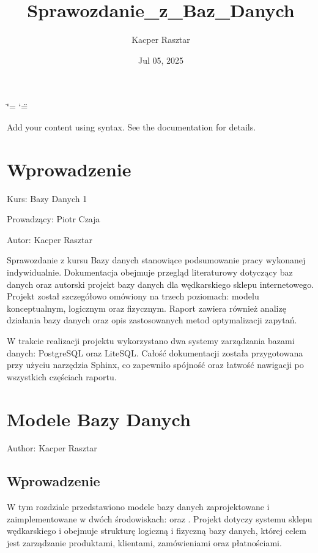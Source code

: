 \documentclass[letterpaper,10pt,english]{sphinxmanual}
\title{Sprawozdanie\_z\_Baz\_Danych}
\date{Jul 05, 2025}
\author{Kacper Rasztar}
\begin{document}
\ifdefined\shorthandoff
  \ifnum\catcode`\=\string=\active\shorthandoff{=}\fi
  \ifnum\catcode`\"=\active{}\fi
\fi

\pagestyle{empty}
\sphinxmaketitle
\pagestyle{plain}
\sphinxtableofcontents
\pagestyle{normal}
\label{\detokenize{index::doc}}


\sphinxAtStartPar
Add your content using  syntax. See the
documentation for details.

\sphinxstepscope


\chapter{Wprowadzenie}
\label{\detokenize{rozdzial1/index:wprowadzenie}}\label{\detokenize{rozdzial1/index::doc}}
\sphinxAtStartPar
Kurs: Bazy Danych 1

\sphinxAtStartPar
Prowadzący: Piotr Czaja

\sphinxAtStartPar
Autor: Kacper Rasztar

\sphinxAtStartPar
Sprawozdanie z kursu Bazy danych stanowiące podsumowanie pracy wykonanej indywidualnie. Dokumentacja obejmuje przegląd literaturowy dotyczący baz danych oraz autorski projekt bazy danych dla wędkarskiego sklepu internetowego. Projekt został szczegółowo omówiony na trzech poziomach: modelu konceptualnym, logicznym oraz fizycznym. Raport zawiera również analizę działania bazy danych oraz opis zastosowanych metod optymalizacji zapytań.

\sphinxAtStartPar
W trakcie realizacji projektu wykorzystano dwa systemy zarządzania bazami danych: PostgreSQL oraz LiteSQL. Całość dokumentacji została przygotowana przy użyciu narzędzia Sphinx, co zapewniło spójność oraz łatwość nawigacji po wszystkich częściach raportu.

\sphinxstepscope


\chapter{Modele Bazy Danych}
\label{\detokenize{rozdzial3/index:modele-bazy-danych}}\label{\detokenize{rozdzial3/index::doc}}
\sphinxAtStartPar
Author: Kacper Rasztar


\section{Wprowadzenie}
\label{\detokenize{rozdzial3/index:wprowadzenie}}
\sphinxAtStartPar
W tym rozdziale przedstawiono modele bazy danych zaprojektowane i zaimplementowane w dwóch środowiskach:  oraz . Projekt dotyczy systemu sklepu wędkarskiego i obejmuje strukturę logiczną i fizyczną bazy danych, której celem jest zarządzanie produktami, klientami, zamówieniami oraz płatnościami.
\end{document}
